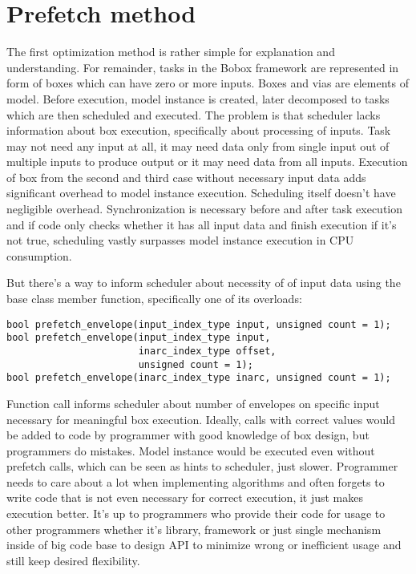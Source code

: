 \chapter{Prefetch method}
\label{prefetch}
The first optimization method is rather simple for explanation and understanding. For remainder, tasks in the Bobox framework are represented in form of boxes which can have zero or more inputs. Boxes and vias are elements of model. Before execution, model instance is created, later decomposed to tasks which are then scheduled and executed. The problem is that scheduler lacks information about box execution, specifically about processing of inputs. Task may not need any input at all, it may need data only from single input out of multiple inputs to produce output or it may need data from all inputs. Execution of box from the second and third case without necessary input data adds significant overhead to model instance execution. Scheduling itself doesn't have negligible overhead. Synchronization is necessary before and after task execution and if code only checks whether it has all input data and finish execution if it's not true, scheduling vastly surpasses model instance execution in CPU consumption.

But there's a way to inform scheduler about necessity of of input data using the  base class member function, specifically one of its overloads:

\begin{lstlisting}
bool prefetch_envelope(input_index_type input, unsigned count = 1);
bool prefetch_envelope(input_index_type input,
                       inarc_index_type offset,
                       unsigned count = 1);
bool prefetch_envelope(inarc_index_type inarc, unsigned count = 1);
\end{lstlisting}

Function call informs scheduler about number of envelopes on specific input necessary for meaningful box execution. Ideally, calls with correct values would be added to code by programmer with good knowledge of box design, but programmers do mistakes. Model instance would be executed even without prefetch calls, which can be seen as hints to scheduler, just slower. Programmer needs to care about a lot when implementing algorithms and often forgets to write code that is not even necessary for correct execution, it just makes execution better. It's up to programmers who provide their code for usage to other programmers whether it's library, framework or just single mechanism inside of big code base to design API to minimize wrong or inefficient usage and still keep desired flexibility.

